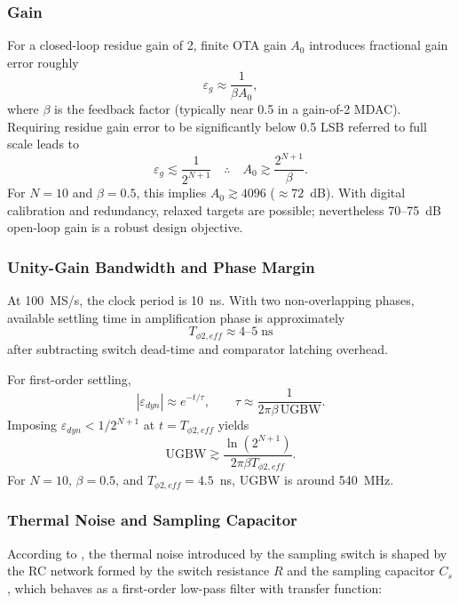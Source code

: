 \documentclass[11pt,a4paper]{article}
\begin{document}
\subsubsection{Gain}
For a closed-loop residue gain of 2, finite OTA gain $A_0$ introduces fractional gain error roughly
\begin{equation}
\varepsilon_g\approx\frac{1}{\beta A_0},
\end{equation}
where $\beta$ is the feedback factor (typically near 0.5 in a gain-of-2 MDAC). Requiring residue gain error to be significantly below 0.5 LSB referred to full scale leads to
\begin{equation}
\varepsilon_g\lesssim\frac{1}{2^{N+1}} \quad\therefore\quad A_0\gtrsim\frac{2^{N+1}}{\beta}.
\end{equation}
For $N=10$ and $\beta=0.5$, this implies $A_0\gtrsim 4096$ ($\approx72$~dB). With digital calibration and redundancy, relaxed targets are possible; nevertheless 70--75~dB open-loop gain is a robust design objective.

\subsubsection{Unity-Gain Bandwidth and Phase Margin}
At 100~MS/s, the clock period is 10~ns. With two non-overlapping phases, available settling time in amplification phase is approximately
\begin{equation}
T_{\phi2,eff}\approx 4\text{--}5\;\text{ns}
\end{equation}
after subtracting switch dead-time and comparator latching overhead.

For first-order settling,
\begin{equation}
\left|\varepsilon_{dyn}\right|\approx e^{-t/\tau},\qquad \tau\approx\frac{1}{2\pi\beta\,\text{UGBW}}.
\end{equation}
Imposing $\varepsilon_{dyn}<1/2^{N+1}$ at $t=T_{\phi2,eff}$ yields
\begin{equation}
\text{UGBW}\gtrsim \frac{\ln(2^{N+1})}{2\pi\beta T_{\phi2,eff}}.
\end{equation}
For $N=10$, $\beta=0.5$, and $T_{\phi2,eff}=4.5$~ns, UGBW is around 540~MHz.

\subsubsection{Thermal Noise and Sampling Capacitor}
According to \cite{kledrowetz_mdac_2011}, the thermal noise introduced by the sampling switch is shaped by the RC network formed by the switch resistance $R$ and the sampling capacitor $C_s$, which behaves as a first-order low-pass filter with transfer function:
\end{document}
